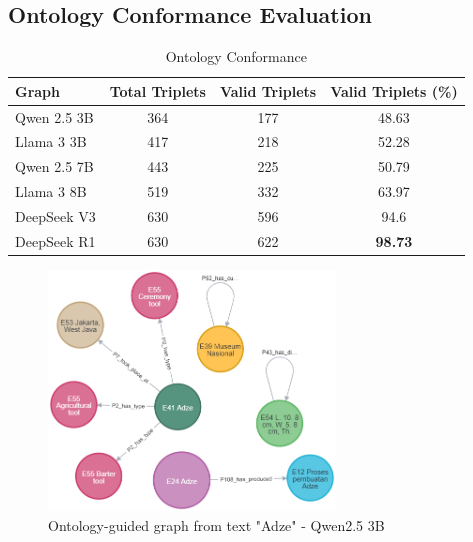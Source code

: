 \documentclass[a4, conference]{IEEEtran}
\begin{document}
\subsection{Ontology Conformance Evaluation}

\begin{table}[h]
    \centering
    \caption{Ontology Conformance}
    \label{tab:oc_percent}
    \begin{tabular}{|l|c|c|c|}
        \hline
        Graph       & Total Triplets & Valid Triplets & Valid Triplets (\%) \\
        \hline
        Qwen 2.5 3B & 364            & 177            & 48.63               \\
        \hline
        Llama 3 3B  & 417            & 218            & 52.28               \\
        \hline
        Qwen 2.5 7B & 443            & 225            & 50.79               \\
        \hline
        Llama 3 8B  & 519            & 332            & 63.97               \\
        \hline
        DeepSeek V3 & 630            & 596            & 94.6                \\
        \hline
        DeepSeek R1 & 630            & 622            & \textbf{98.73}      \\
        \hline
    \end{tabular}
\end{table}

\begin{figure}[!t]
    \centering
    \includegraphics[width=3in]{assets/graph-qwen3b-adze}
    \caption{Ontology-guided graph from text "Adze" - Qwen2.5 3B}
    \label{fig_graph_qwen3b_adze}
\end{figure}
\end{document}
